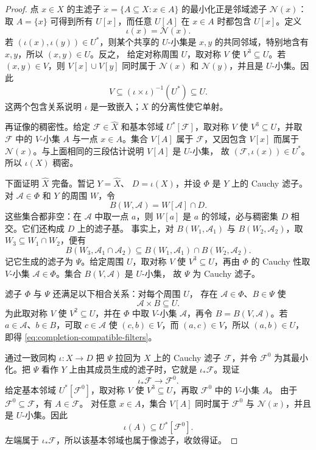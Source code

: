 \begin{proof}
点 \(x\in X\) 的主滤子
\(\dot x=\{A\subseteq X:x\in A\}\) 的最小化正是邻域滤子
\(\mathcal N(x)\)：取 \(A=\{x\}\) 可得到所有 \(U[x]\)，而任意
\(U[A]\) 在 \(x\in A\) 时都包含 \(U[x]\)。定义
\[
 \iota(x)=\mathcal N(x).
\]
若 \((\iota(x),\iota(y))\in U^*\)，则某个共享的 \(U\)-小集是
\(x,y\) 的共同邻域，特别地含有 \(x,y\)，所以 \((x,y)\in U\)。反之，
给定对称周围 \(U\)，取对称 \(V\) 使 \(V^3\subseteq U\)。若
\((x,y)\in V\)，则 \(V[x]\cup V[y]\) 同时属于
\(\mathcal N(x)\) 和 \(\mathcal N(y)\)，并且是 \(U\)-小集。因此
\[
 V\subseteq(\iota\times\iota)^{-1}(U^*)\subseteq U.
\]
这两个包含关系说明 \(\iota\) 是一致嵌入；\(X\) 的分离性使它单射。

再证像的稠密性。给定 \(\mathcal F\in\widehat X\) 和基本邻域
\(U^*[\mathcal F]\)，取对称 \(V\) 使 \(V^3\subseteq U\)，并取
\(\mathcal F\) 中的 \(V\)-小集 \(A\) 与一点 \(x\in A\)。集合
\(V[A]\) 属于 \(\mathcal F\)，又因包含 \(V[x]\) 而属于
\(\mathcal N(x)\)。与上面相同的三段估计说明 \(V[A]\) 是 \(U\)-小集，
故 \((\mathcal F,\iota(x))\in U^*\)。所以 \(\iota(X)\) 稠密。

下面证明 \(\widehat X\) 完备。暂记 \(Y=\widehat X\)、
\(D=\iota(X)\)，并设 \(\Phi\) 是 \(Y\) 上的 Cauchy 滤子。对
\(\mathcal A\in\Phi\) 和 \(Y\) 的周围 \(W\)，令
\[
 B(W,\mathcal A)=W[\mathcal A]\cap D.
\]
这些集合都非空：在 \(\mathcal A\) 中取一点 \(a\)，则 \(W[a]\) 是
\(a\) 的邻域，必与稠密集 \(D\) 相交。它们还构成 \(D\) 上的滤子基。
事实上，对 \(B(W_1,\mathcal A_1)\) 与
\(B(W_2,\mathcal A_2)\)，取
\(W_3\subseteq W_1\cap W_2\)，便有
\[
 B(W_3,\mathcal A_1\cap\mathcal A_2)
 \subseteq B(W_1,\mathcal A_1)\cap B(W_2,\mathcal A_2).
\]
记它生成的滤子为 \(\Psi\)。给定周围 \(U\)，取对称 \(V\) 使
\(V^3\subseteq U\)，再由 \(\Phi\) 的 Cauchy 性取 \(V\)-小集
\(\mathcal A\in\Phi\)。集合 \(B(V,\mathcal A)\) 是 \(U\)-小集，
故 \(\Psi\) 为 Cauchy 滤子。

滤子 \(\Phi\) 与 \(\Psi\) 还满足以下相合关系：对每个周围 \(U\)，
存在 \(\mathcal A\in\Phi\)、\(B\in\Psi\) 使
\begin{equation}
 \mathcal A\times B\subseteq U.
 \label{eq:completion-compatible-filters}
\end{equation}
为此取对称 \(V\) 使 \(V^2\subseteq U\)，并在 \(\Phi\) 中取
\(V\)-小集 \(\mathcal A\)，再令
\(B=B(V,\mathcal A)\)。若 \(a\in\mathcal A\)、\(b\in B\)，可取
\(c\in\mathcal A\) 使 \((c,b)\in V\)，而
\((a,c)\in V\)，所以 \((a,b)\in U\)，即得
\eqref{eq:completion-compatible-filters}。

通过一致同构 \(\iota:X\to D\) 把 \(\Psi\) 拉回为 \(X\) 上的 Cauchy
滤子 \(\mathcal F\)，并令 \(\mathcal F^0\) 为其最小化。把
\(\Psi\) 看作 \(Y\) 上由其成员生成的滤子时，它就是
\(\iota_*\mathcal F\)。现证
\[
 \iota_*\mathcal F\longrightarrow\mathcal F^0.
\]
给定基本邻域 \(U^*[\mathcal F^0]\)，取对称 \(V\) 使
\(V^3\subseteq U\)，再取 \(\mathcal F^0\) 中的 \(V\)-小集 \(A\)。
由于 \(\mathcal F^0\subseteq\mathcal F\)，有 \(A\in\mathcal F\)。
对任意 \(x\in A\)，集合 \(V[A]\) 同时属于
\(\mathcal F^0\) 与 \(\mathcal N(x)\)，并且是 \(U\)-小集。因此
\[
 \iota(A)\subseteq U^*[\mathcal F^0].
\]
左端属于 \(\iota_*\mathcal F\)，所以该基本邻域也属于像滤子，收敛得证。


\end{proof}
